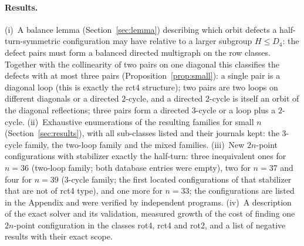 \documentclass[11pt]{article}
\theoremstyle{remark}
\newcommand{\Dfour}{D_4}
\begin{document}
\paragraph{Results.}
(i)~A balance lemma (Section~\ref{sec:lemma}) describing which orbit defects a half-turn-symmetric configuration may have
relative to a larger subgroup $H\le\Dfour$: the defect pairs must form a balanced directed multigraph on the row classes.
Together with the collinearity of two pairs on one diagonal this classifies the defects with at most three pairs
(Proposition~\ref{prop:small}): a single pair is a diagonal loop (this is exactly the rct4 structure); two pairs are two
loops on different diagonals or a directed $2$-cycle, and a directed $2$-cycle is itself an orbit of the diagonal
reflections; three pairs form a directed $3$-cycle or a loop plus a $2$-cycle.
(ii)~Exhaustive enumerations of the resulting families for small $n$ (Section~\ref{sec:results}), with all sub-classes
listed and their journals kept: the $3$-cycle family, the two-loop family and the mixed families.
(iii)~New $2n$-point configurations with stabilizer exactly the half-turn: three inequivalent ones for $n=36$ (two-loop
family; both database entries were empty), two for $n=37$ and four for $n=39$ ($3$-cycle family; the first located
configurations of that stabilizer that are not of rct4 type), and one more for $n=33$; the configurations are listed in
the Appendix and were verified by independent programs.
(iv)~A description of the exact solver and its validation, measured growth of the cost of finding one $2n$-point
configuration in the classes rot4, rct4 and rot2, and a list of negative results with their exact scope.
\end{document}
